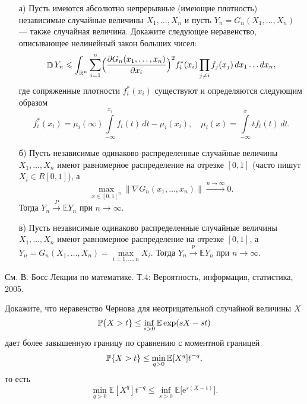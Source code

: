 \begin{problem} [В.И. Опойцев]
\begin{enumerate}
\item[а)] Пусть имеются абсолютно непрерывные (имеющие плотность) независимые случайные величины $X_1,\ldots, X_n$ и пусть 
$Y_n=G_n(X_1,\ldots, X_n)$ --- также случайная величина. Докажите следующее неравенство, описывающее нелинейный закон больших чисел: 
$$
\mathop{\mathbb{D}}\nolimits Y_n\leqslant \int_{{\mathbb R}^n} \sum\limits_{i=1}^{n} \Bigl(\frac{\partial G_n(x_1,\ldots, x_n)}{\partial x_i} \Bigr)^2 f_i^*(x_i)
\prod\limits_{j\ne i} f_j(x_j)\, dx_1\ldots dx_n , 
$$
где сопряженные плотности $f_i^*(x_i)$ существуют и определяются следующим образом 
$$
f_i^*(x_i)=\mu_i(\infty)\int\limits_{-\infty}^{x_i} f_i(t)\, dt -\mu_i(x_i), \quad 
\mu_i(x)=\int\limits_{-\infty}^{x} tf_i(t)\, dt . 
$$

\item[б)] Пусть независимые одинаково распределенные случайные величины $X_1,\ldots, X_n$ имеют равномерное распределение на отрезке 
$[0,1]$ (часто пишут $X_i\in R[0,1]$), а 
$$
\max\limits_{x\in [0,1]^n} \|\nabla G_n(x_1,\ldots, x_n) \|\xrightarrow{n\to\infty} 0 . 
$$
Тогда $Y_n\xrightarrow{P}{\mathbb E}Y_n$ при $n\to\infty$. 

\item[в)] Пусть независимые одинаково распределенные случайные величины $X_1,\ldots, X_n$ имеют равномерное распределение на отрезке 
$[0,1]$, а $Y_n=G_n(X_1,\ldots, X_n)=\max\limits_{i=1,\ldots, n} X_i$. Тогда $Y_n\xrightarrow{p}{\mathbb E}Y_n$ при $n\to\infty$. 

\end{enumerate}
\end{problem}

\begin{remark}
См. В. Босс Лекции по математике. Т.4: Вероятность, информация, статистика, 2005.
\end{remark}


\begin{problem}
Докажите, что неравенство Чернова для неотрицательной случайной величины $X$
\begin{equation*}
\mathrm{{\mathbb P}}\{ X >t\}\leq \inf_{s>0}\mathbb{E}\exp(sX-st)
\end{equation*}
 дает более завышенную границу по сравнению с моментной границей
\begin{equation*}
\mathrm{{\mathbb P}}\{ X >t\}\leq \min_{q>0}\mathbb{E}[X^q]t^{-q},
\end{equation*}
 то есть 
\begin{equation*}
\min_{q>0}\mathbb{E}[X^q]t^{-q}\leq \inf_{s>0}\mathbb{E}\big[\text{e}^{s(X-t)}\bigl].
\end{equation*}
\end{problem}

